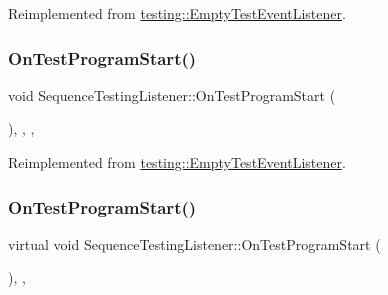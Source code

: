 Reimplemented from \mbox{\hyperlink{classtesting_1_1_empty_test_event_listener_ac3f5033fcd82080edb45f546ce9854fe}{testing\+::\+Empty\+Test\+Event\+Listener}}.

\mbox{\label{class_sequence_testing_listener_a2dcf940322a480b210d8e5e934dd0a79}} 
\subsubsection{\texorpdfstring{OnTestProgramStart()}{OnTestProgramStart()}\hspace{0.1cm}{\footnotesize\ttfamily [2/3]}}
{\footnotesize\ttfamily void Sequence\+Testing\+Listener\+::\+On\+Test\+Program\+Start (\begin{DoxyParamCaption}\item[{const \mbox{\hyperlink{classtesting_1_1_unit_test}{Unit\+Test}} \&}]{ }\end{DoxyParamCaption})\hspace{0.3cm}{\ttfamily [inline]}, {\ttfamily [override]}, {\ttfamily [protected]}, {\ttfamily [virtual]}}



Reimplemented from \mbox{\hyperlink{classtesting_1_1_empty_test_event_listener_ac3f5033fcd82080edb45f546ce9854fe}{testing\+::\+Empty\+Test\+Event\+Listener}}.

\mbox{\label{class_sequence_testing_listener_a25b96acdbaa6f582e583e6b56bd39b42}} 
\subsubsection{\texorpdfstring{OnTestProgramStart()}{OnTestProgramStart()}\hspace{0.1cm}{\footnotesize\ttfamily [3/3]}}
{\footnotesize\ttfamily virtual void Sequence\+Testing\+Listener\+::\+On\+Test\+Program\+Start (\begin{DoxyParamCaption}\item[{const \mbox{\hyperlink{classtesting_1_1_unit_test}{Unit\+Test}} \&}]{ }\end{DoxyParamCaption})\hspace{0.3cm}{\ttfamily [inline]}, {\ttfamily [protected]}, {\ttfamily [virtual]}}



